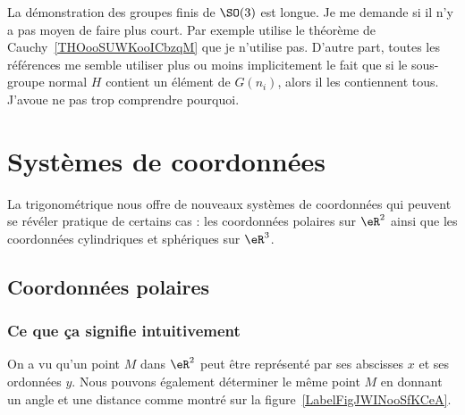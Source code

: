 \begin{probleme}
    La démonstration des groupes finis de \( \SO(3)\) est longue. Je me demande si il n'y a pas moyen de faire plus court. Par exemple \cite{ooYODPooHeNKiQ} utilise le théorème de Cauchy~\ref{THOooSUWKooICbzqM} que je n'utilise pas. D'autre part, toutes les références me semble utiliser plus ou moins implicitement le fait que si le sous-groupe normal \( H\) contient un élément de \( G(n_i)\), alors il les contiennent tous. J'avoue ne pas trop comprendre pourquoi.
\end{probleme}

\section{Systèmes de coordonnées}
\label{SECooWTPRooZbOSzO}

La trigonométrique nous offre de nouveaux systèmes de coordonnées qui peuvent se révéler pratique de certains cas : les coordonnées polaires sur \( \eR^2\) ainsi que les coordonnées cylindriques et sphériques sur \( \eR^3\).

\subsection{Coordonnées polaires}

\subsubsection{Ce que ça signifie intuitivement}

On a vu qu'un point $M$ dans $\eR^2$ peut être représenté par ses abscisses $x$ et ses ordonnées $y$. Nous pouvons également déterminer le même point $M$ en donnant un angle et une distance comme montré sur la figure~\ref{LabelFigJWINooSfKCeA}.
\newcommand{\CaptionFigJWINooSfKCeA}{Un point en coordonnées polaires est donné par sa distance à l'origine et par l'angle qu'il faut avec l'horizontale.}




